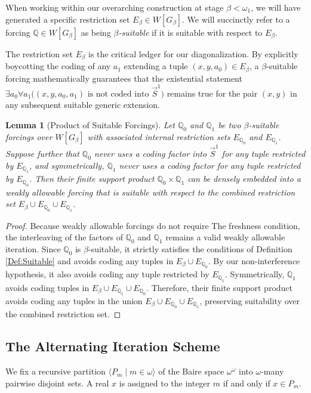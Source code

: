 \documentclass{article}
\theoremstyle{plain}
\newtheorem{lemma}[theorem]{Lemma}
\theoremstyle{definition}
\newcommand{\forceQ}{\mathbb{Q}}
\begin{document}
When working within our overarching construction at stage $\beta < \omega_1$, we will have generated a specific restriction set $E_\beta \in W[G_\beta]$. We will succinctly refer to a forcing $\forceQ \in W[G_\beta]$ as being \emph{$\beta$-suitable} if it is suitable with respect to $E_\beta$. 

The restriction set $E_\beta$ is the critical ledger for our diagonalization. By explicitly boycotting the coding of any $a_1$ extending a tuple $(x, y, a_0) \in E_\beta$, a $\beta$-suitable forcing mathematically guarantees that the existential statement $\exists a_0 \forall a_1 \big( (x, y, a_0, a_1) \text{ is not coded into } \vec{S}^1 \big)$ remains true for the pair $(x,y)$ in any subsequent suitable generic extension. 

\begin{lemma}[Product of Suitable Forcings] \label{Lemma:ProductSuitable}
Let $\forceQ_0$ and $\forceQ_1$ be two $\beta$-suitable forcings over $W[G_\beta]$ with associated internal restriction sets $E_{\forceQ_0}$ and $E_{\forceQ_1}$. Suppose further that $\forceQ_0$ never uses a coding factor into $\vec{S}^1$ for any tuple restricted by $E_{\forceQ_1}$, and symmetrically, $\forceQ_1$ never uses a coding factor for any tuple restricted by $E_{\forceQ_0}$. Then their finite support product $\forceQ_0 \times \forceQ_1$ can be densely embedded into a weakly allowable forcing that is suitable with respect to the combined restriction set $E_\beta \cup E_{\forceQ_0} \cup E_{\forceQ_1}$.
\end{lemma}
\begin{proof}
Because weakly allowable forcings do not require The freshness condition, the interleaving of the factors of $\forceQ_0$ and $\forceQ_1$ remains a valid weakly allowable iteration. Since $\forceQ_0$ is $\beta$-suitable, it strictly satisfies the conditions of Definition \ref{Def:Suitable} and avoids coding any tuples in $E_\beta \cup E_{\forceQ_0}$. By our non-interference hypothesis, it also avoids coding any tuple restricted by $E_{\forceQ_1}$. Symmetrically, $\forceQ_1$ avoids coding tuples in $E_\beta \cup E_{\forceQ_1} \cup E_{\forceQ_0}$. Therefore, their finite support product  avoids coding any tuples in the union $E_\beta \cup E_{\forceQ_0} \cup E_{\forceQ_1}$, preserving suitability over the combined restriction set.
\end{proof}

\subsection{The Alternating Iteration Scheme}
We fix a recursive partition $\langle P_m \mid m \in \omega \rangle$ of the Baire space $\omega^\omega$ into $\omega$-many pairwise disjoint sets. A real $x$ is assigned to the integer $m$ if and only if $x \in P_m$. 
\end{document}
